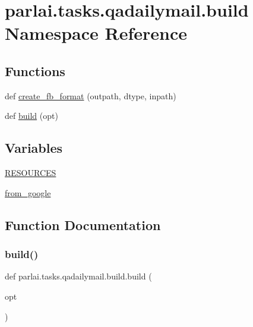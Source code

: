 \hypertarget{namespaceparlai_1_1tasks_1_1qadailymail_1_1build}{}\section{parlai.\+tasks.\+qadailymail.\+build Namespace Reference}
\label{namespaceparlai_1_1tasks_1_1qadailymail_1_1build}
\subsection*{Functions}
\begin{DoxyCompactItemize}
\item 
def \hyperlink{namespaceparlai_1_1tasks_1_1qadailymail_1_1build_a91296a105f8b2d3f5c53d34282cf6e62}{create\+\_\+fb\+\_\+format} (outpath, dtype, inpath)
\item 
def \hyperlink{namespaceparlai_1_1tasks_1_1qadailymail_1_1build_ac5d9b858a94d4fe241cd57a6fd0ccf1c}{build} (opt)
\end{DoxyCompactItemize}
\subsection*{Variables}
\begin{DoxyCompactItemize}
\item 
\hyperlink{namespaceparlai_1_1tasks_1_1qadailymail_1_1build_a02ef3b1091c6cd3ab59d22b37d31ebf9}{R\+E\+S\+O\+U\+R\+C\+ES}
\item 
\hyperlink{namespaceparlai_1_1tasks_1_1qadailymail_1_1build_a9fd39fbb47a4bd1849df9453114fe00e}{from\+\_\+google}
\end{DoxyCompactItemize}


\subsection{Function Documentation}
\mbox{\label{namespaceparlai_1_1tasks_1_1qadailymail_1_1build_ac5d9b858a94d4fe241cd57a6fd0ccf1c}} 
\subsubsection{\texorpdfstring{build()}{build()}}
{\footnotesize\ttfamily def parlai.\+tasks.\+qadailymail.\+build.\+build (\begin{DoxyParamCaption}\item[{}]{opt }\end{DoxyParamCaption})}



